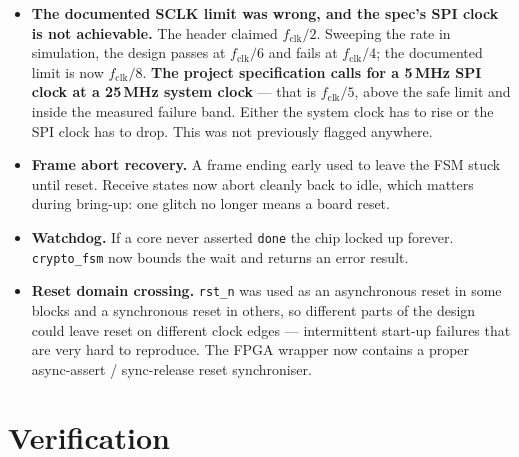 \documentclass[11pt,a4paper]{article}
\begin{document}
\begin{itemize}[nosep,leftmargin=1.4em]
\item \textbf{The documented SCLK limit was wrong, and the spec's SPI clock is
      not achievable.} The header claimed $f_{\mathrm{clk}}/2$. Sweeping the
      rate in simulation, the design passes at $f_{\mathrm{clk}}/6$ and fails
      at $f_{\mathrm{clk}}/4$; the documented limit is now
      $f_{\mathrm{clk}}/8$. \textbf{The project specification calls for a
      5\,MHz SPI clock at a 25\,MHz system clock} --- that is
      $f_{\mathrm{clk}}/5$, above the safe limit and inside the measured
      failure band. Either the system clock has to rise or the SPI clock has to
      drop. This was not previously flagged anywhere.
\item \textbf{Frame abort recovery.} A frame ending early used to leave the FSM
      stuck until reset. Receive states now abort cleanly back to idle, which
      matters during bring-up: one glitch no longer means a board reset.
\item \textbf{Watchdog.} If a core never asserted \texttt{done} the chip locked
      up forever. \texttt{crypto\_fsm} now bounds the wait and returns an
      error result.
\item \textbf{Reset domain crossing.} \texttt{rst\_n} was used as an
      asynchronous reset in some blocks and a synchronous reset in others, so
      different parts of the design could leave reset on different clock edges
      --- intermittent start-up failures that are very hard to reproduce. The
      FPGA wrapper now contains a proper async-assert / sync-release reset
      synchroniser.
\end{itemize}

\section{Verification}\label{sec:verif}
\end{document}
